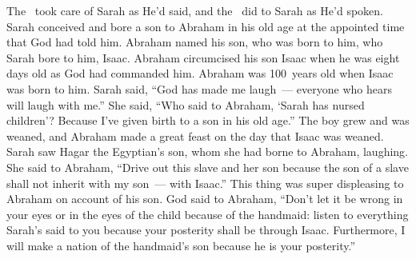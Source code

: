 
\begin{inparaenum}
   The \lord\ took care of Sarah as He'd said, and the \lord\ did to Sarah as He'd spoken.%
   Sarah conceived and bore a son to Abraham in his old age at the appointed time that God had told him.%
   Abraham named his son, who was born to him, who Sarah bore to him, Isaac.%
   Abraham circumcised his son Isaac when he was eight days old as God had commanded him.%
   Abraham was 100~years old when Isaac was born to him.%
   Sarah said, ``God has made me laugh~--- everyone who hears will laugh with me.''%
   She said, ``Who said to Abraham, `Sarah has nursed children'? Because I've given birth to a son in his old age.''%
   The boy grew and was weaned, and Abraham made a great feast on the day that Isaac was weaned.%
   Sarah saw Hagar the Egyptian's son, whom she had borne to Abraham, laughing.%
   She said to Abraham, ``Drive out this slave and her son because the son of a slave shall not inherit with my son~--- with Isaac.''%
   This\understood{} thing was super displeasing to Abraham on account of his son.%
   God said to Abraham, ``Don't let it be wrong in your eyes or in the eyes of the child because of the handmaid: listen to everything Sarah's said to you because your posterity shall be through Isaac.%
   Furthermore, I will make a nation of the handmaid's son because he is your posterity.''%

\end{inparaenum}
